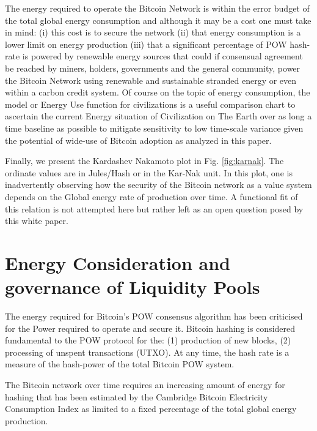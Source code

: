 \documentclass[final,5p,times,twocolumn,authoryear]{elsarticle}
\begin{document}
The energy required to operate the Bitcoin Network is within the error budget of the total global energy consumption and although it may be a  cost one must take in mind: (i) this cost is to secure the network (ii) that energy consumption is a lower limit on energy production (iii) that a significant percentage of POW hash-rate is powered by renewable energy sources that could if consensual agreement be reached by miners,  holders, governments and the general community, power the Bitcoin Network using renewable and sustainable stranded energy or even within a carbon credit system. Of course on the topic of energy consumption, the \cite{kar64} model or Energy Use function for civilizations is a useful comparison chart to ascertain the current Energy situation of Civilization on The Earth over as long a time baseline as possible to mitigate sensitivity to low time-scale variance given the potential of wide-use of Bitcoin adoption as analyzed in this paper.

Finally, we present the Kardashev Nakamoto plot in Fig. \ref{fig:karnak}. The ordinate values are in Jules/Hash or in the Kar-Nak unit. In this plot, one is inadvertently observing how the security of the Bitcoin network as a value system depends on the Global energy rate of production over time. A functional fit of this relation is not attempted here but rather left as an open question posed by this white paper.

\section{Energy Consideration and governance of Liquidity Pools}
\label{sec:btc4}

The energy required for Bitcoin's POW consensus algorithm has been criticised for the Power required to operate and secure it. Bitcoin hashing is considered fundamental to the POW protocol for the: (1) production of new blocks, (2) processing of unspent transactions (UTXO). At any time, the hash rate is a measure of the hash-power of the total Bitcoin POW system. 

The Bitcoin network over time requires an increasing amount of energy for hashing that has been estimated by the Cambridge Bitcoin Electricity Consumption Index as limited to a fixed percentage of the total global energy production. 
\end{document}
